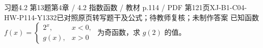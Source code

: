 \par\noindent\begin{minipage}{\linewidth}
\begin{bankitem}{习题4.2 第13题}{第4章 / 4.2 指数函数 / 教材 p.114 / PDF 第121页}{XJ-B1-C04-HW-P114-Y1332}{已对照原页转写题干及公式；待教师复核；未制作答案}
已知函数 $f(x)=\begin{cases}2^x,&x<0,\\g(x),&x>0\end{cases}$ 为奇函数，求 $g(2)$ 的值。
\end{bankitem}
\end{minipage}\par\medskip
